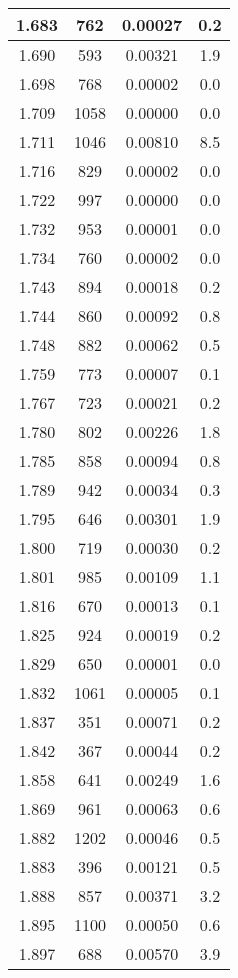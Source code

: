 \begin{longtable}{c | c | c | c}
1.683 &  762 & 0.00027 &  0.2 \\ \hline 
1.690 &  593 & 0.00321 &  1.9 \\ \hline 
1.698 &  768 & 0.00002 &  0.0 \\ \hline 
1.709 & 1058 & 0.00000 &  0.0 \\ \hline 
1.711 & 1046 & 0.00810 &  8.5 \\ \hline 
1.716 &  829 & 0.00002 &  0.0 \\ \hline 
1.722 &  997 & 0.00000 &  0.0 \\ \hline 
1.732 &  953 & 0.00001 &  0.0 \\ \hline 
1.734 &  760 & 0.00002 &  0.0 \\ \hline 
1.743 &  894 & 0.00018 &  0.2 \\ \hline 
1.744 &  860 & 0.00092 &  0.8 \\ \hline 
1.748 &  882 & 0.00062 &  0.5 \\ \hline 
1.759 &  773 & 0.00007 &  0.1 \\ \hline 
1.767 &  723 & 0.00021 &  0.2 \\ \hline 
1.780 &  802 & 0.00226 &  1.8 \\ \hline 
1.785 &  858 & 0.00094 &  0.8 \\ \hline 
1.789 &  942 & 0.00034 &  0.3 \\ \hline 
1.795 &  646 & 0.00301 &  1.9 \\ \hline 
1.800 &  719 & 0.00030 &  0.2 \\ \hline 
1.801 &  985 & 0.00109 &  1.1 \\ \hline 
1.816 &  670 & 0.00013 &  0.1 \\ \hline 
1.825 &  924 & 0.00019 &  0.2 \\ \hline 
1.829 &  650 & 0.00001 &  0.0 \\ \hline 
1.832 & 1061 & 0.00005 &  0.1 \\ \hline 
1.837 &  351 & 0.00071 &  0.2 \\ \hline 
1.842 &  367 & 0.00044 &  0.2 \\ \hline 
1.858 &  641 & 0.00249 &  1.6 \\ \hline 
1.869 &  961 & 0.00063 &  0.6 \\ \hline 
1.882 & 1202 & 0.00046 &  0.5 \\ \hline 
1.883 &  396 & 0.00121 &  0.5 \\ \hline 
1.888 &  857 & 0.00371 &  3.2 \\ \hline 
1.895 & 1100 & 0.00050 &  0.6 \\ \hline 
1.897 &  688 & 0.00570 &  3.9 \\ \hline 

\end{longtable}
